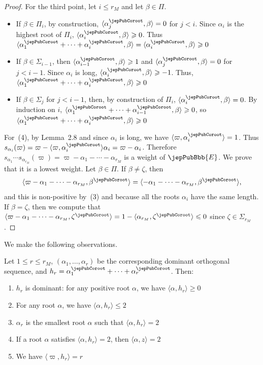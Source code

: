 \begin{proof}
For the third point, let $i\leqslant r_M$ and let $\beta\in\Pi$.
\begin{itemize}
\item If $\beta\in\Pi_i$, by construction, $\langle\alpha_j^\jepPubCoroot,\beta\rangle=0$ for $j<i$. Since $\alpha_i$ is the highest root of $\Pi_i$, $\langle\alpha_i^\jepPubCoroot,\beta\rangle\geqslant0$. Thus $\langle\alpha_1^\jepPubCoroot+\cdots+\alpha_i^\jepPubCoroot,\beta\rangle=\langle\alpha_i^\jepPubCoroot,\beta\rangle\geqslant0$
\item If $\beta\in\Sigma_{i-1}$, then $\langle\alpha_{i-1}^\jepPubCoroot,\beta\rangle\geqslant1$ and $\langle\alpha_j^\jepPubCoroot,\beta\rangle=0$ for $j<i-1$. Since $\alpha_i$ is long, $\langle\alpha_i^\jepPubCoroot,\beta\rangle\geqslant-1$. Thus, $\langle\alpha_1^\jepPubCoroot+\cdots+\alpha_i^\jepPubCoroot,\beta\rangle\geqslant0$
\item If $\beta\in\Sigma_j$ for $j<i-1$, then, by construction of $\Pi_i$, $\langle\alpha_i^\jepPubCoroot,\beta\rangle=0$. By induction on $i$, $\langle\alpha_1^\jepPubCoroot+\cdots+\alpha_{i-1}^\jepPubCoroot,\beta\rangle\geqslant0$, so $\langle\alpha_1^\jepPubCoroot+\cdots+\alpha_i^\jepPubCoroot,\beta\rangle\geqslant0$
\end{itemize}
For~(4), by Lemma~2.8 and since $\alpha_i$ is long, we have $\langle\varpi,\alpha_i^\jepPubCoroot\rangle=1$. Thus $s_{\alpha_i}(\varpi)=\varpi-\langle\varpi,\alpha_i^\jepPubCoroot\rangle\alpha_i=\varpi-\alpha_i$. Therefore $s_{\alpha_1}\cdots s_{\alpha_{r_M}}(\varpi)=\varpi-\alpha_1-\cdots-\alpha_{r_M}$ is a weight of $\jepPubBbb{E}$. We prove that it is a lowest weight. Let $\beta\in\Pi$. If $\beta\neq\zeta$, then
\[
\langle\varpi-\alpha_1-\cdots-\alpha_{r_M},\beta^\jepPubCoroot\rangle=\langle-\alpha_1-\cdots-\alpha_{r_M},\beta^\jepPubCoroot\rangle,
\]
and this is non-positive by~(3) and because all the roots $\alpha_i$ have the same length. If $\beta=\zeta$, then we compute that $\langle\varpi-\alpha_1-\cdots-\alpha_{r_M},\zeta^\jepPubCoroot\rangle=1-\langle\alpha_{r_M},\zeta^\jepPubCoroot\rangle\leqslant0$ since $\zeta\in\Sigma_{r_M}$.
\end{proof}
We make the following observations.
\begin{proposition}
Let $1\leqslant r\leqslant r_M$, $(\alpha_1,\ldots,\alpha_r)$ be the corresponding dominant orthogonal sequence, and $h_r=\alpha_1^\jepPubCoroot+\cdots+\alpha_r^\jepPubCoroot$. Then:
\begin{enumerate}[label=(\arabic*)]
\item $h_r$ is dominant: for any positive root $\alpha$, we have $\langle\alpha,h_r\rangle\geqslant0$
\item For any root $\alpha$, we have $\langle\alpha,h_r\rangle\leqslant2$
\item $\alpha_r$ is the smallest root $\alpha$ such that $\langle\alpha,h_r\rangle=2$
\item If a root $\alpha$ satisfies $\langle\alpha,h_r\rangle=2$, then $\langle\alpha,z\rangle=2$
\item We have $\langle\varpi,h_r\rangle=r$
\end{enumerate}
\end{proposition}
